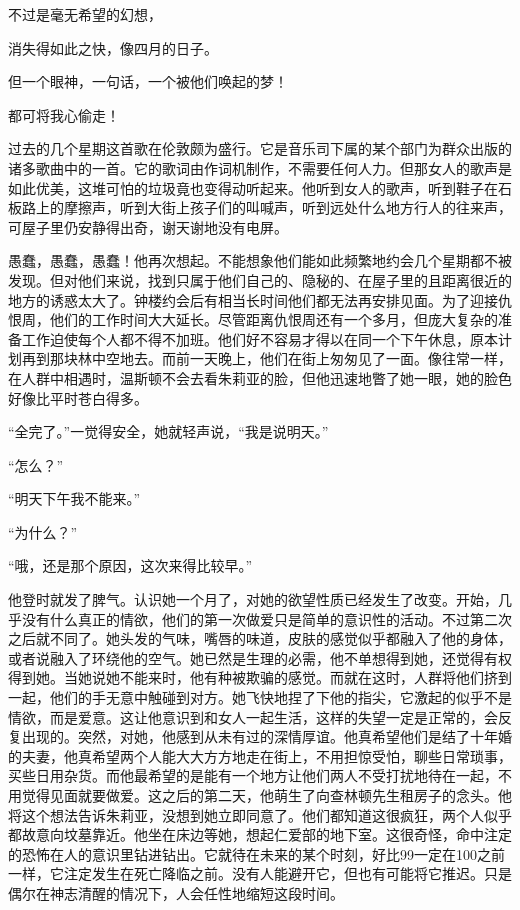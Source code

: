 不过是毫无希望的幻想，

消失得如此之快，像四月的日子。

但一个眼神，一句话，一个被他们唤起的梦！

都可将我心偷走！

过去的几个星期这首歌在伦敦颇为盛行。它是音乐司下属的某个部门为群众出版的诸多歌曲中的一首。它的歌词由作词机制作，不需要任何人力。但那女人的歌声是如此优美，这堆可怕的垃圾竟也变得动听起来。他听到女人的歌声，听到鞋子在石板路上的摩擦声，听到大街上孩子们的叫喊声，听到远处什么地方行人的往来声，可屋子里仍安静得出奇，谢天谢地没有电屏。

愚蠢，愚蠢，愚蠢！他再次想起。不能想象他们能如此频繁地约会几个星期都不被发现。但对他们来说，找到只属于他们自己的、隐秘的、在屋子里的且距离很近的地方的诱惑太大了。钟楼约会后有相当长时间他们都无法再安排见面。为了迎接仇恨周，他们的工作时间大大延长。尽管距离仇恨周还有一个多月，但庞大复杂的准备工作迫使每个人都不得不加班。他们好不容易才得以在同一个下午休息，原本计划再到那块林中空地去。而前一天晚上，他们在街上匆匆见了一面。像往常一样，在人群中相遇时，温斯顿不会去看朱莉亚的脸，但他迅速地瞥了她一眼，她的脸色好像比平时苍白得多。

``全完了。''一觉得安全，她就轻声说，``我是说明天。''

``怎么？''

``明天下午我不能来。''

``为什么？''

``哦，还是那个原因，这次来得比较早。''

他登时就发了脾气。认识她一个月了，对她的欲望性质已经发生了改变。开始，几乎没有什么真正的情欲，他们的第一次做爱只是简单的意识性的活动。不过第二次之后就不同了。她头发的气味，嘴唇的味道，皮肤的感觉似乎都融入了他的身体，或者说融入了环绕他的空气。她已然是生理的必需，他不单想得到她，还觉得有权得到她。当她说她不能来时，他有种被欺骗的感觉。而就在这时，人群将他们挤到一起，他们的手无意中触碰到对方。她飞快地捏了下他的指尖，它激起的似乎不是情欲，而是爱意。这让他意识到和女人一起生活，这样的失望一定是正常的，会反复出现的。突然，对她，他感到从未有过的深情厚谊。他真希望他们是结了十年婚的夫妻，他真希望两个人能大大方方地走在街上，不用担惊受怕，聊些日常琐事，买些日用杂货。而他最希望的是能有一个地方让他们两人不受打扰地待在一起，不用觉得见面就要做爱。这之后的第二天，他萌生了向查林顿先生租房子的念头。他将这个想法告诉朱莉亚，没想到她立即同意了。他们都知道这很疯狂，两个人似乎都故意向坟墓靠近。他坐在床边等她，想起仁爱部的地下室。这很奇怪，命中注定的恐怖在人的意识里钻进钻出。它就待在未来的某个时刻，好比99一定在100之前一样，它注定发生在死亡降临之前。没有人能避开它，但也有可能将它推迟。只是偶尔在神志清醒的情况下，人会任性地缩短这段时间。

